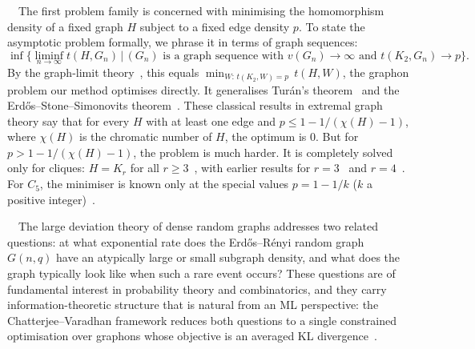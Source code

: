 \documentclass{article}
\theoremstyle{plain}
\theoremstyle{definition}
\theoremstyle{remark}
\begin{document}
\ $\,$
The first problem family is concerned with minimising the homomorphism density of a fixed graph $H$ subject to a fixed edge density $p$. To state the asymptotic problem formally, we phrase it in terms of graph sequences:
\begin{equation}
\label{eqn:extremalproblem:generalisedTuran}
\inf\Big\{\liminf_{n \to \infty} t(H, G_n) \,\Big|\, \text{$(G_n)$ is a graph sequence with } v(G_n)\to\infty \text{ and } t(K_2, G_n)\to p\Big\}.
\end{equation}
By the graph-limit theory~\citep{lovasz2012large}, this equals $\min_{W:\,t(K_2,W)=p}\, t(H, W)$, the graphon problem our method optimises directly.
It generalises Tur\'an's theorem~\citep{turan1941eine}
and the Erd\H{o}s--Stone--Simonovits theorem~\citep{erdos1946structure, erdos1966limit}. These classical results in extremal graph theory say
that for every $H$ with at least one edge and $p \leq 1 - 1/(\chi(H) - 1)$, where $\chi(H)$ is the chromatic number of $H$, the optimum is $0$. But for $p > 1 - 1/(\chi(H) - 1)$, the problem is much harder. It is completely solved only for cliques: $H = K_r$ for all $r \ge 3$~\citep{reiher2016clique}, with earlier results for $r = 3$~\citep{razborov2008minimal} and $r = 4$~\citep{nikiforov2011number}. For $C_5$, the minimiser is known only at the special values $p = 1 - 1/k$ ($k$ a positive integer)~\citep{bennett2020minimizing}.

\ $\,$
The large deviation theory of dense random graphs addresses two related questions: at what exponential rate does the Erd\H{o}s--R\'enyi random graph $G(n,q)$ have an atypically large or small subgraph density, and what does the graph typically look like when such a rare event occurs?
These questions are of fundamental interest in probability theory and combinatorics, and they carry information-theoretic structure that is natural from an ML perspective: the Chatterjee--Varadhan framework reduces both questions to a single constrained optimisation over graphons whose objective is an averaged KL divergence~\citep{chatterjee2011large}.
\end{document}
